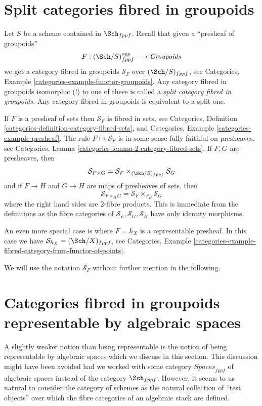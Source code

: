 \section{Split categories fibred in groupoids}
\label{algebraic-section-split}
Let $S$ be a scheme contained in $\Sch_{fppf}$.
Recall that given a ``presheaf of groupoids''
$$
F : (\Sch/S)_{fppf}^{opp} \longrightarrow \textit{Groupoids}
$$
we get a category fibred in groupoids $\mathcal{S}_F$ over
$(\Sch/S)_{fppf}$, see
Categories, Example \ref{categories-example-functor-groupoids}.
Any category fibred in groupoids isomorphic (!) to one of these
is called a {\it split category fibred in groupoids}.
Any category fibred in groupoids is equivalent to a split one.

\medskip\noindent
If $F$ is a presheaf of sets then $\mathcal{S}_F$ is
fibred in sets, see
Categories,
Definition \ref{categories-definition-category-fibred-sets},
and
Categories, Example \ref{categories-example-presheaf}.
The rule $F \mapsto \mathcal{S}_F$ is in some sense fully faithful
on presheaves, see
Categories, Lemma \ref{categories-lemma-2-category-fibred-sets}.
If $F, G$ are presheaves, then
$$
\mathcal{S}_{F \times G}
=
\mathcal{S}_F \times_{(\Sch/S)_{fppf}} \mathcal{S}_G
$$
and if $F \to H$ and $G \to H$ are maps of presheaves of sets, then
$$
\mathcal{S}_{F \times_H G} =
\mathcal{S}_F \times_{\mathcal{S}_H} \mathcal{S}_G
$$
where the right hand sides are $2$-fibre products. This is immediate
from the definitions as the fibre categories of
$\mathcal{S}_F, \mathcal{S}_G, \mathcal{S}_H$ have only identity morphisms.

\medskip\noindent
An even more special case is where $F = h_X$ is a representable
presheaf. In this case we have
$\mathcal{S}_{h_X} = (\Sch/X)_{fppf}$, see
Categories,
Example \ref{categories-example-fibred-category-from-functor-of-points}.

\medskip\noindent
We will use the notation $\mathcal{S}_F$ without further mention in the
following.

\section{Categories fibred in groupoids representable by algebraic spaces}
\label{algebraic-section-representable-by-algebraic-spaces}
A slightly weaker notion than being representable is the notion of
being representable by algebraic spaces which we discuss in this section.
This discussion might have been avoided had we worked with some category
$\textit{Spaces}_{fppf}$ of algebraic spaces instead of the category
$\Sch_{fppf}$. However, it seems to us natural to consider the
category of schemes as the natural collection of ``test objects'' over
which the fibre categories of an algebraic stack are defined.

